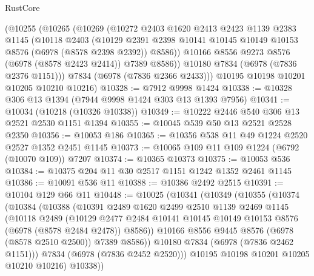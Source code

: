 \begin{lexlean}{RustCore}
\begin{coremodule}
      (@10255
        (@10265
          (@10269
            (@10272
              @2403
              @1620
              @2413
              @2423
              @1139
              @2383
              @1145
              (@10118
                @2403
                (@10129
                  @2391
                  @2398
                  @10141
                  @10145
                  @10149
                  @10153
                  @8576
                  (@6978 (@8578 @2398 @2392))
                  @8586))
              @10166
              @8556
              @9273
              @8576
              (@6978 (@8578 @2423 @2414))
              @7389
              @8586))
          @10180
          @7834
          (@6978 (@7836 @2376 @1151)))
        @7834
        (@6978 (@7836 @2366 @2433)))
      @10195
      @10198
      @10201
      @10205
      @10210
      @10216)
@10328 := @7912 @9998 @1424
@10338 := @10328 @306 @13 @1394 (@7944 @9998 @1424 @303 @13 @1393 @7956)
@10341 := @10034 (@10218 (@10326 @10338))
@10349 := @10222 @2446 @540 @306 @13 @2521 @2530 @1151 @1394
@10355 := @10045 @539 @50 @13 @2521 @2528 @2350
@10356 := @10053 @186
@10365 := @10356 @538 @11 @49 @1224 @2520 @2527 @1352 @2451 @1145
@10373 := @10065 @109 @11 @109 @1224 (@6792 (@10070 @109)) @7207
@10374 := @10365 @10373
@10375 := @10053 @536
@10384 := @10375 @204 @11 @30 @2517 @1151 @1242 @1352 @2461 @1145
@10386 := @10091 @536 @11
@10388 := @10386 @2492 @2515
@10391 := @10104 @129 @66 @11
@10448 := @10025
    (@10341
      (@10349
        (@10355
          (@10374
            (@10384
              (@10388
                (@10391
                  @2489
                  @1620
                  @2499
                  @2510
                  @1139
                  @2469
                  @1145
                  (@10118
                    @2489
                    (@10129
                      @2477
                      @2484
                      @10141
                      @10145
                      @10149
                      @10153
                      @8576
                      (@6978 (@8578 @2484 @2478))
                      @8586))
                  @10166
                  @8556
                  @9445
                  @8576
                  (@6978 (@8578 @2510 @2500))
                  @7389
                  @8586))
              @10180
              @7834
              (@6978 (@7836 @2462 @1151)))
            @7834
            (@6978 (@7836 @2452 @2520)))
          @10195
          @10198
          @10201
          @10205
          @10210
          @10216)
        @10338))

\end{coremodule}
\end{lexlean}
